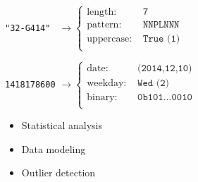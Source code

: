 \begin{block}{}
  
  	\texttt{"32-G414"~} $\longrightarrow
  	  \begin{cases}
  	  	\text{length: } & \texttt{7}\\
  	  	\text{pattern: } & \texttt{NNPLNNN}\\
  	  	\text{uppercase: } & \texttt{True (1)}\\
  	  \end{cases}$
  	  
	\texttt{1418178600} $\longrightarrow
  	  \begin{cases}
    	  	\text{date: } & \texttt{(2014,12,10)}\\
    	  	\text{weekday: } & \texttt{Wed (2)}\\
    	  	\text{binary: } & \texttt{0b101...0010}\\
  	  \end{cases}$
  
	\begin{itemize}
		\item Statistical analysis
		\item Data modeling
		\item Outlier detection
	\end{itemize}
\end{block}